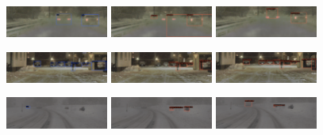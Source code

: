 \documentclass[report.tex]{subfiles}
\begin{document}
\begin{figure}[h!]
        \includegraphics[width=0.3\textwidth]{images/results/hrfuser_vs_mtdetr/samples/snow_1/2018-12-17_07-36-29_03040.png}
        \includegraphics[width=0.3\textwidth]{images/results/hrfuser_vs_mtdetr/samples/snow_1/2018-12-17_07-36-29_03040_former.png}
        \includegraphics[width=0.3\textwidth]{images/results/hrfuser_vs_mtdetr/samples/snow_1/2018-12-17_07-36-29_03040_m_cropped.png}

        \includegraphics[width=0.3\textwidth]{images/results/hrfuser_vs_mtdetr/samples/snow_2/2018-12-17_07-57-00_01500.png}
        \includegraphics[width=0.3\textwidth]{images/results/hrfuser_vs_mtdetr/samples/snow_2/2018-12-17_07-57-00_01500_former.png}
        \includegraphics[width=0.3\textwidth]{images/results/hrfuser_vs_mtdetr/samples/snow_2/2018-12-17_07-57-00_01500_m_cropped.png}
        
        \includegraphics[width=0.3\textwidth]{images/results/hrfuser_vs_mtdetr/samples/snow_3/2019-01-09_13-23-24_02700.png}
        \includegraphics[width=0.3\textwidth]{images/results/hrfuser_vs_mtdetr/samples/snow_3/2019-01-09_13-23-24_02700_former.png}
        \includegraphics[width=0.3\textwidth]{images/results/hrfuser_vs_mtdetr/samples/snow_3/2019-01-09_13-23-24_02700_m_cropped.png}


\end{figure}
\end{document}
